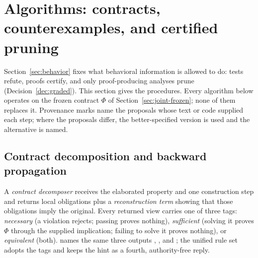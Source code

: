 \section{Algorithms: contracts, counterexamples, and certified pruning}\label{alg:behavior}

Section~\ref{sec:behavior} fixes what behavioral information is allowed to do: tests refute, proofs certify, and only proof-producing analyses prune (Decision~\ref{dec:graded}). This section gives the procedures. Every algorithm below operates on the frozen contract $\Phi$ of Section~\ref{sec:joint-frozen}; none of them replaces it. Provenance marks name the proposals whose text or code supplied each step; where the proposals differ, the better-specified version is used and the alternative is named.

\subsection{Contract decomposition and backward propagation}

A \emph{contract decomposer} receives the elaborated property and one construction step and returns local obligations plus a \emph{reconstruction term} showing that those obligations imply the original. Every returned view carries one of three tags: \emph{necessary} (a violation rejects; passing proves nothing), \emph{sufficient} (solving it proves $\Phi$ through the supplied implication; failing to solve it proves nothing), or \emph{equivalent} (both).  names the same three outputs , , and ; the unified rule set adopts the tags and keeps the hint as a fourth, authority-free reply.

